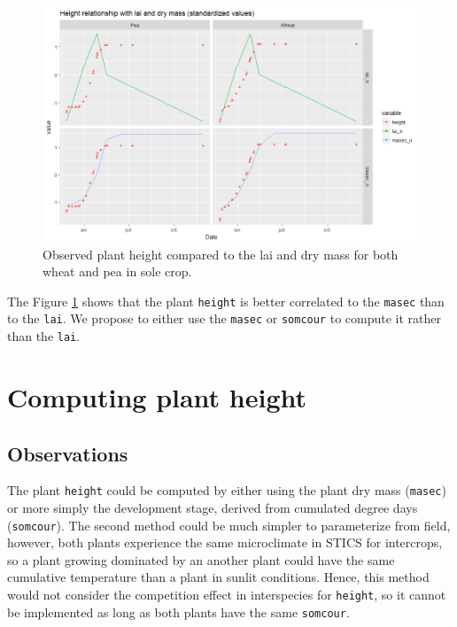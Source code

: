\documentclass[]{book}
\begin{document}
\begin{figure}
\centering
\includegraphics{img/height2.png}
\caption{\label{fig:height2}Observed plant height compared to the lai and dry mass for both wheat and pea in sole crop.}
\end{figure}

The Figure \ref{fig:height2} shows that the plant \texttt{height} is better correlated to the \texttt{masec} than to the \texttt{lai}. We propose to either use the \texttt{masec} or \texttt{somcour} to compute it rather than the \texttt{lai}.

\hypertarget{computing-plant-height}{%
\section{Computing plant height}\label{computing-plant-height}}

\hypertarget{observations}{%
\subsection{Observations}\label{observations}}

The plant \texttt{height} could be computed by either using the plant dry mass (\texttt{masec}) or more simply the development stage, derived from cumulated degree days (\texttt{somcour}).
The second method could be much simpler to parameterize from field, however, both plants experience the same microclimate in STICS for intercrops, so a plant growing dominated by an another plant could have the same cumulative temperature than a plant in sunlit conditions. Hence, this method would not consider the competition effect in interspecies for \texttt{height}, so it cannot be implemented as long as both plants have the same \texttt{somcour}.
\end{document}
